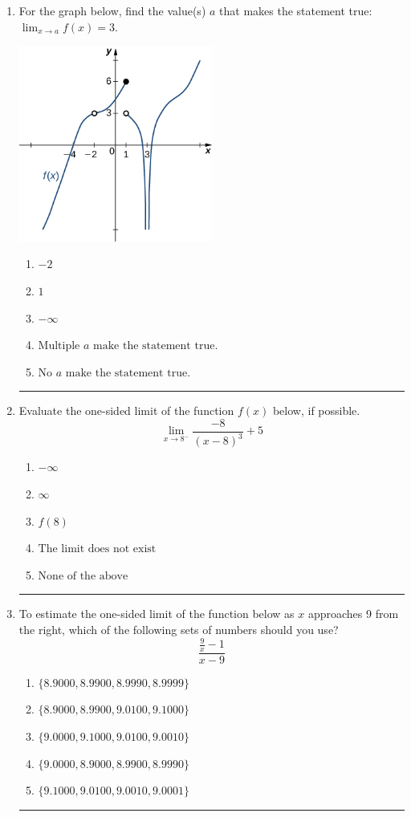\documentclass[14pt]{extbook}
\newcommand{\litem}[1]{\item#1\hspace*{-1cm}\rule{\textwidth}{0.4pt}}
\begin{document}
\begin{enumerate}
{\begin{enumerate}[label=\Alph*.]
\end{enumerate} }
\litem{
For the graph below, find the value(s) $a$ that makes the statement true: $ \displaystyle \lim_{x \rightarrow a} f(x) = 3$.
\begin{center}
    \includegraphics[width=0.5\textwidth]{../Figures/evaluateLimitGraphicallyB.png}
\end{center}
\begin{enumerate}[label=\Alph*.]
\item \( -2 \)
\item \( 1 \)
\item \( -\infty \)
\item \( \text{Multiple } a \text{ make the statement true}. \)
\item \( \text{No } a \text{ make the statement true}. \)

\end{enumerate} }
\litem{
Evaluate the one-sided limit of the function $f(x)$ below, if possible.\[ \lim_{x \rightarrow 8^-} \frac{-8}{(x-8)^3}+5 \]\begin{enumerate}[label=\Alph*.]
\item \( -\infty \)
\item \( \infty \)
\item \( f(8) \)
\item \( \text{The limit does not exist} \)
\item \( \text{None of the above} \)

\end{enumerate} }
\litem{
To estimate the one-sided limit of the function below as $x$ approaches 9 from the right, which of the following sets of numbers should you use?\[ \frac{\frac{9}{x} - 1}{x - 9} \]\begin{enumerate}[label=\Alph*.]
\item \( \{ 8.9000, 8.9900, 8.9990, 8.9999 \} \)
\item \( \{ 8.9000, 8.9900, 9.0100, 9.1000 \} \)
\item \( \{ 9.0000, 9.1000, 9.0100, 9.0010 \} \)
\item \( \{ 9.0000, 8.9000, 8.9900, 8.9990 \} \)
\item \( \{ 9.1000, 9.0100, 9.0010, 9.0001 \} \)


\end{enumerate}}
\end{enumerate}
\end{document}
